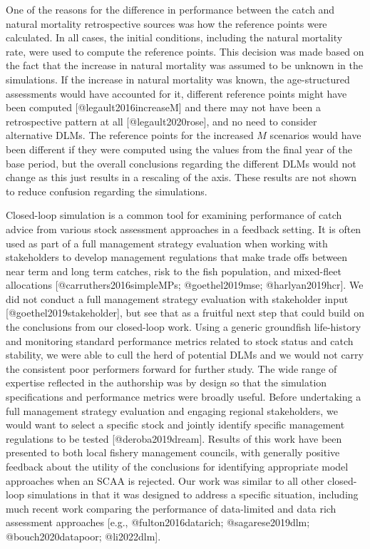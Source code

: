 \documentclass[
]{article}
\begin{document}
One of the reasons for the difference in performance between the catch and natural mortality retrospective sources was how the reference points were calculated. In all cases, the initial conditions, including the natural mortality rate, were used to compute the reference points. This decision was made based on the fact that the increase in natural mortality was assumed to be unknown in the simulations. If the increase in natural mortality was known, the age-structured assessments would have accounted for it, different reference points might have been computed {[}@legault2016increaseM{]} and there may not have been a retrospective pattern at all {[}@legault2020rose{]}, and no need to consider alternative DLMs. The reference points for the increased \(M\) scenarios would have been different if they were computed using the values from the final year of the base period, but the overall conclusions regarding the different DLMs would not change as this just results in a rescaling of the axis. These results are not shown to reduce confusion regarding the simulations.

Closed-loop simulation is a common tool for examining performance of catch advice from various stock assessment approaches in a feedback setting. It is often used as part of a full management strategy evaluation when working with stakeholders to develop management regulations that make trade offs between near term and long term catches, risk to the fish population, and mixed-fleet allocations {[}@carruthers2016simpleMPs; @goethel2019mse; @harlyan2019hcr{]}. We did not conduct a full management strategy evaluation with stakeholder input {[}@goethel2019stakeholder{]}, but see that as a fruitful next step that could build on the conclusions from our closed-loop work. Using a generic groundfish life-history and monitoring standard performance metrics related to stock status and catch stability, we were able to cull the herd of potential DLMs and we would not carry the consistent poor performers forward for further study. The wide range of expertise reflected in the authorship was by design so that the simulation specifications and performance metrics were broadly useful. Before undertaking a full management strategy evaluation and engaging regional stakeholders, we would want to select a specific stock and jointly identify specific management regulations to be tested {[}@deroba2019dream{]}. Results of this work have been presented to both local fishery management councils, with generally positive feedback about the utility of the conclusions for identifying appropriate model approaches when an SCAA is rejected. Our work was similar to all other closed-loop simulations in that it was designed to address a specific situation, including much recent work comparing the performance of data-limited and data rich assessment approaches {[}e.g., @fulton2016datarich; @sagarese2019dlm; @bouch2020datapoor; @li2022dlm{]}.
\end{document}
